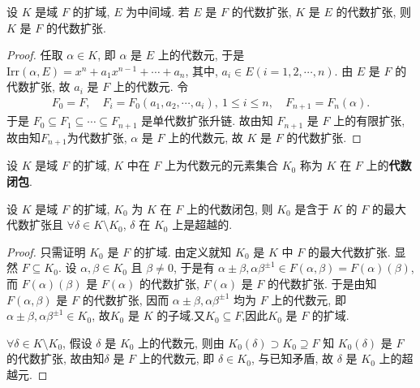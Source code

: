 \documentclass[../../main.tex]{subfiles}%
\begin{document}
\begin{corollary}\label{corollary:抽象代数--推论3.2.4}
设 $K$ 是域 $F$ 的扩域, $E$ 为中间域. 若 $E$ 是 $F$ 的代数扩张, $K$ 是 $E$ 的代数扩张, 则 $K$ 是 $F$ 的代数扩张.
\end{corollary}
\begin{proof}

任取 $\alpha\in K$, 即 $\alpha$ 是 $E$ 上的代数元, 于是 $\mathrm{Irr}(\alpha,E)=x^n+a_1x^{n-1}+\cdots+a_n$, 其中, $a_i\in E(i=1,2,\cdots,n)$. 由 $E$ 是 $F$ 的代数扩张, 故 $a_i$ 是 $F$ 上的代数元. 令
\begin{align*}
F_0=F,\quad F_i=F_0(a_1,a_2,\cdots,a_i),\ 1\leqslant i\leqslant n,\quad F_{n+1}=F_n(\alpha).
\end{align*}
于是 $F_0\subseteq F_1\subseteq\cdots\subseteq F_{n+1}$ 是单代数扩张升链. 故由知 $F_{n+1}$ 是 $F$ 上的有限扩张, 故由知$F_{n+1}$为代数扩张, $\alpha$ 是 $F$ 上的代数元, 故 $K$ 是 $F$ 的代数扩张.


\end{proof}

\begin{definition}
设 $K$ 是域 $F$ 的扩域, $K$ 中在 $F$ 上为代数元的元素集合 $K_0$ 称为 $K$ 在 $F$ 上的\textbf{代数闭包}.
\end{definition}

\begin{theorem}
设 $K$ 是域 $F$ 的扩域, $K_0$ 为 $K$ 在 $F$ 上的代数闭包, 则 $K_0$ 是含于 $K$ 的 $F$ 的最大代数扩张且 $\forall \delta\in K\setminus K_0$, $\delta$ 在 $K_0$ 上是超越的.
\end{theorem}
\begin{proof}

只需证明 $K_0$ 是 $F$ 的扩域. 由定义就知 $K_0$ 是 $K$ 中 $F$ 的最大代数扩张. 显然 $F\subseteq K_0$. 设 $\alpha,\beta\in K_0$ 且 $\beta\neq 0$, 于是有 $\alpha\pm\beta,\alpha\beta^{\pm 1}\in F(\alpha,\beta)=F(\alpha)(\beta)$, 而 $F(\alpha)(\beta)$ 是 $F(\alpha)$ 的代数扩张, $F(\alpha)$ 是 $F$ 的代数扩张. 于是由知 $F(\alpha,\beta)$ 是 $F$ 的代数扩张, 因而 $\alpha\pm\beta,\alpha\beta^{\pm 1}$ 均为 $F$ 上的代数元, 即 $\alpha\pm\beta,\alpha\beta^{\pm 1}\in K_0$, 故$K_0$ 是 $K$ 的子域.又$K_0\subseteq F$,因此$K_0$ 是 $F$ 的扩域.

$\forall \delta\in K\setminus K_0$, 假设 $\delta$ 是 $K_0$ 上的代数元, 则由 $K_0(\delta)\supset K_0\supseteq F$ 知 $K_0(\delta)$ 是 $F$ 的代数扩张, 故由知$\delta$ 是 $F$ 上的代数元, 即 $\delta\in K_0$, 与已知矛盾, 故 $\delta$ 是 $K_0$ 上的超越元.

\end{proof}
\end{document}
